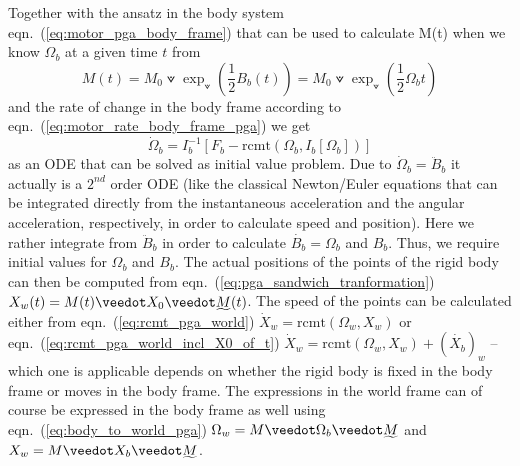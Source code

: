 Together with the ansatz in the body system eqn.~(\ref{eq:motor_pga_body_frame}) that can
be used to calculate M(t) when we know $\Omega_b$ at a given time $t$ from
\begin{equation*}
   M(t) = M_0 \veedot \exp_\veedot(\frac{1}{2} B_b(t))
        = M_0 \veedot \exp_\veedot(\frac{1}{2} \Omega_b t) 
\end{equation*}
and the rate of change in the body frame according to
eqn.~(\ref{eq:motor_rate_body_frame_pga}) we get
\begin{equation}
    \dot{\Omega}_b = I_b^{-1}\left[ F_{b} - \mathrm{rcmt}(\Omega_b,I_b[\Omega_b]) \right] 
    \label{eq:ode_system_body_frame}
\end{equation}
as an ODE that can be solved as initial value problem. Due to $\dot{\Omega}_b =
\ddot{B}_b$ it actually is a $2^{nd}$ order ODE (like the classical Newton/Euler equations
that can be integrated directly from the instantaneous acceleration and the angular
acceleration, respectively, in order to calculate speed and position). Here we rather
integrate from $\ddot{B}_b$ in order to calculate $\dot{B_b} = \Omega_b$ and $B_b$. Thus,
we require initial values for $\Omega_b$ and $B_b$. The actual positions of the points of
the rigid body can then be computed from eqn.~(\ref{eq:pga_sandwich_tranformation})
$X_w(t) = M(t) \veedot X_0 \veedot \rrev{M}(t)$. The speed of the points can be calculated
either from eqn.~(\ref{eq:rcmt_pga_world}) $\dot{X}_w = \mathrm{rcmt}(\Omega_w,X_w)$ or
eqn.~(\ref{eq:rcmt_pga_world_incl_X0_of_t}) $\dot{X}_w = \mathrm{rcmt}(\Omega_w,X_w)+
(\dot{X_b})_w$ -- which one is applicable depends on whether the rigid body is fixed in
the body frame or moves in the body frame. The expressions in the world frame can of
course be expressed in the body frame as well using eqn.~(\ref{eq:body_to_world_pga})
$\Omega_w = M \veedot \Omega_b \veedot \rrev{M}$ and $X_w = M \veedot X_b \veedot
\rrev{M}$.

